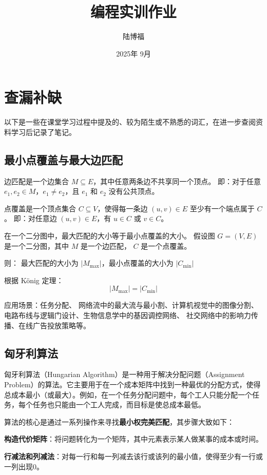 \documentclass{article}
\title{编程实训作业}
\author{陆博福}
\date{2025年 9月}
\begin{document}
\maketitle

\section{查漏补缺}
以下是一些在课堂学习过程中提及的、较为陌生或不熟悉的词汇，在进一步查阅资料学习后记录了笔记。
\subsection{最小点覆盖与最大边匹配}

边匹配是一个边集合 $ M \subseteq E $，其中任意两条边不共享同一个顶点。
即：对于任意 $ e_1, e_2 \in M $，$ e_1 \neq e_2 $，且 $ e_1 $ 和 $ e_2 $ 没有公共顶点。

点覆盖是一个顶点集合 $ C \subseteq V $，使得每一条边 $ (u, v) \in E $ 至少有一个端点属于 $ C $。
即：对任意边 $ (u, v) \in E $，有 $ u \in C $ 或 $ v \in C $。

在一个二分图中，最大匹配的大小等于最小点覆盖的大小。
假设图 $ G = (V, E) $ 是一个二分图，其中
$ M $ 是一个边匹配，
$ C $ 是一个点覆盖。

则：
最大匹配的大小为 $ |M_{\max}| $，最小点覆盖的大小为 $ |C_{\min}| $

根据 König 定理：
$$
|M_{\max}| = |C_{\min}|
$$

应用场景：任务分配、 网络流中的最大流与最小割、计算机视觉中的图像分割、电路布线与逻辑门设计、生物信息学中的基因调控网络、 社交网络中的影响力传播、在线广告投放策略等。

\needspace{5cm} 
\subsection{匈牙利算法}

匈牙利算法（Hungarian Algorithm）是一种用于解决分配问题（Assignment Problem）的算法。它主要用于在一个成本矩阵中找到一种最优的分配方式，使得总成本最小（或最大）。例如，在一个任务分配问题中，每个工人只能分配一个任务，每个任务也只能由一个工人完成，而目标是使总成本最低。

算法的核心是通过一系列操作来寻找\textbf{最小权完美匹配}，其步骤大致如下：

\textbf{构造代价矩阵}：将问题转化为一个矩阵，其中元素表示某人做某事的成本或时间。

\textbf{行减法和列减法}：对每一行和每一列减去该行或该列的最小值，使得至少有一行或一列出现0。
\end{document}
